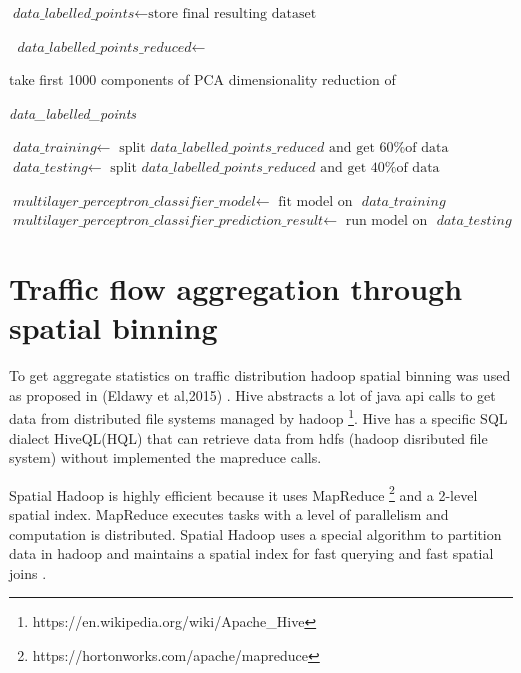 \documentclass[12pt, a4paper]{report}
\theoremstyle{definition}
\theoremstyle{definition}%
\theoremstyle{definition}%
\theoremstyle{definition}%
\theoremstyle{definition}%
\theoremstyle{definition}%
\begin{document}
\begin{algorithm}
\begin{algorithmic} [1]
			\State $\textit{data\_labelled\_points} \gets \text{store final resulting dataset}$
			
			\State $\textit{ data\_labelled\_points\_reduced} \gets$ \par 
					take first 1000 components of PCA dimensionality reduction of \par 
					\textit{ data\_labelled\_points}
			
			\State $\textit{data\_training} 	\gets$  $ \text{split } \textit{data\_labelled\_points\_reduced} \text{ and get 60\% of data }$
			\State $\textit{data\_testing} 	    \gets$  $ \text{split } \textit{data\_labelled\_points\_reduced} \text{ and get 40\% of data }$
			
			\State $\textit{multilayer\_perceptron\_classifier\_model} 	\gets$  $\text{fit model on } \textit{ data\_training}$	
			\State $\textit{multilayer\_perceptron\_classifier\_prediction\_result} 	\gets$  $\text{run model on } \textit{ data\_testing}$	
			\State {}
					
			
		\EndIndent 			

	\end{algorithmic}
\end{algorithm}




\section{Traffic flow aggregation through spatial binning} \label{section:spatial_binning}

To get aggregate statistics on traffic distribution hadoop spatial binning was used as proposed in (Eldawy et al,2015) \cite{eldawy2015spatialhadoop}. Hive abstracts a lot of java api calls to get data from distributed file systems managed by hadoop \footnote{https://en.wikipedia.org/wiki/Apache\_Hive}. Hive has a specific SQL dialect HiveQL(HQL) that can retrieve data from hdfs (hadoop disributed file system) without implemented the mapreduce calls.

Spatial Hadoop is highly efficient because it uses MapReduce \footnote{https://hortonworks.com/apache/mapreduce} and a 2-level spatial index. MapReduce executes tasks with a level of parallelism and computation is distributed. Spatial Hadoop uses a special algorithm to partition data in hadoop and maintains a spatial index for fast querying and fast spatial joins \cite{eldawy2015spatialhadoop}. 
\end{document}
